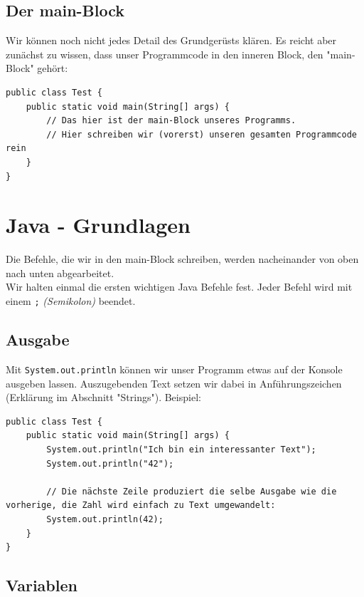 \documentclass[ngerman,11pt]{article}
\begin{document}
    \subsection{Der main-Block}
    Wir können noch nicht jedes Detail des Grundgerüsts klären.
    Es reicht aber zunächst zu wissen, dass unser Programmcode in den inneren Block, den "main-Block" gehört:

    \begin{lstlisting}[caption=main-Block]
public class Test {
    public static void main(String[] args) {
        // Das hier ist der main-Block unseres Programms.
        // Hier schreiben wir (vorerst) unseren gesamten Programmcode rein
    }
}
    \end{lstlisting}


    \section{Java - Grundlagen}

    Die Befehle, die wir in den main-Block schreiben, werden nacheinander von oben nach unten abgearbeitet. \\

    Wir halten einmal die ersten wichtigen Java Befehle fest.
    Jeder Befehl wird mit einem \lstinline{;} \textit{(Semikolon)} beendet.

    \vspace{0.5cm}
    \subsection{Ausgabe}

    Mit \lstinline{System.out.println} können wir unser Programm etwas auf der Konsole ausgeben lassen.
    Auszugebenden Text setzen wir dabei in Anführungszeichen (Erklärung im Abschnitt "Strings").
    Beispiel:

    \begin{lstlisting}[label={lst:sysout},caption=Ausgabe auf der Konsole]
public class Test {
    public static void main(String[] args) {
        System.out.println("Ich bin ein interessanter Text");
        System.out.println("42");

        // Die nächste Zeile produziert die selbe Ausgabe wie die vorherige, die Zahl wird einfach zu Text umgewandelt:
        System.out.println(42);
    }
}
    \end{lstlisting}

    \newpage
    \vspace{0.5cm}
    \subsection{Variablen}
\end{document}
